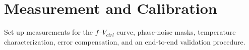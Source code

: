 \chapter{Measurement and Calibration}
Set up measurements for the \(f\)–\(V_{ctrl}\) curve, phase-noise masks, temperature characterization, error compensation, and an end-to-end validation procedure.


